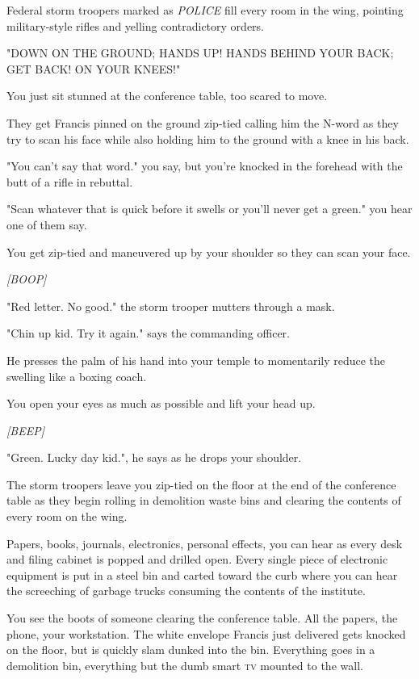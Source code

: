 \documentclass[a5paper, symmetric]{tufte-book}
\begin{document}
Federal storm troopers marked as \textit{POLICE} fill every room in the wing, pointing military-style rifles and yelling contradictory orders. 

"DOWN ON THE GROUND; HANDS UP! HANDS BEHIND YOUR BACK; GET BACK! ON YOUR KNEES!"

You just sit stunned at the conference table, too scared to move. 

They get Francis pinned on the ground zip-tied calling him the N-word as they try to scan his face while also holding him to the ground with a knee in his back. 

"You can't say that word." you say, but you're knocked in the forehead with the butt of a rifle in rebuttal. 

"Scan whatever that is quick before it swells or you'll never get a green." you hear one of them say. 

You get zip-tied and maneuvered up by your shoulder so they can scan your face. 

\textit{[BOOP]}

"Red letter. No good." the storm trooper mutters through a mask. 

"Chin up kid. Try it again." says the commanding officer. 

He presses the palm of his hand into your temple to momentarily reduce the swelling like a boxing coach. 

You open your eyes as much as possible and lift your head up. 

\textit{[BEEP]}

"Green. Lucky day kid.", he says as he drops your shoulder.

The storm troopers leave you zip-tied on the floor at the end of the conference table as they begin rolling in demolition waste bins and clearing the contents of every room on the wing. 

Papers, books, journals, electronics, personal effects, you can hear as every desk and filing cabinet is popped and drilled open. Every single piece of electronic equipment is put in a steel bin and carted toward the curb where you can hear the screeching of garbage trucks consuming the contents of the institute. 

You see the boots of someone clearing the conference table. All the papers, the phone, your workstation. The white envelope Francis just delivered gets knocked on the floor, but is quickly slam dunked into the bin. Everything goes in a demolition bin, everything but the dumb smart \textsc{tv} mounted to the wall.  
\end{document}
